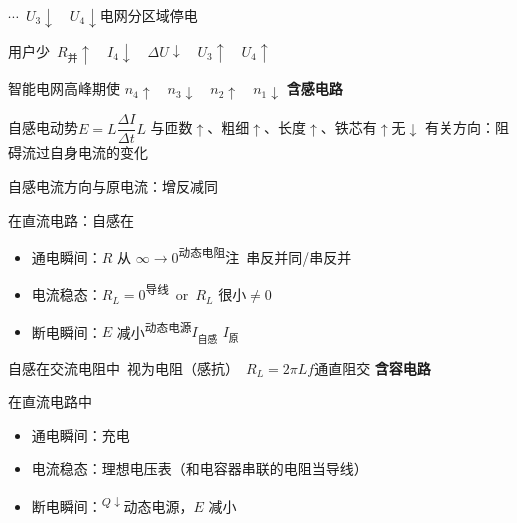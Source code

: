 \noindent $\cdots$\ $U_3\downarrow$\ \ $U_4\downarrow$\quad 电网分区域停电%

\noindent 用户少\ $R_{\text{并}}\uparrow$\ \ $I_4\downarrow$\ \ $\Delta U\downarrow$\ \ $U_3\uparrow$\ \ $U_4\uparrow$%

\noindent 智能电网\quad 高峰期使 $n_4\uparrow$\ \ $n_3\downarrow$\ \ $n_2\uparrow$\ \ $n_1\downarrow$
\textbf{含感电路}

\noindent 自感电动势\quad $E=L\dfrac{\Delta I}{\Delta t}$\quad $L$ 与匝数$\uparrow$、粗细$\uparrow$、长度$\uparrow$、铁芯有$\uparrow$无$\downarrow$ 有关\quad 方向：阻碍流过自身电流的变化%

\noindent\hspace*{4em}自感电流方向与原电流：增反减同

\noindent 在直流电路：自感在
\begin{itemize}
\item 通电瞬间：$R$ 从 $\infty\to0$\textsuperscript{动态电阻}\quad 注\ 串反并同/串反并
\item 电流稳态：$R_L=0$\textsuperscript{导线}\ or\ $R_L$ 很小$\neq0$
\item 断电瞬间：$E$ 减小\textsuperscript{动态电源}\quad $I_{\text{自感}}$ \unclear{$\le$} $I_{\text{原}}$
\end{itemize}

\noindent 自感在交流电阻中\ 视为电阻（感抗）\ $R_L=2\pi Lf$\quad 通直阻交%
\textbf{含容电路}

\noindent 在直流电路中
\begin{itemize}
\item 通电瞬间：充电
\item 电流稳态：理想电压表（和电容器串联的电阻当导线）
\item 断电瞬间：\textsuperscript{$Q\downarrow$}动态电源，$E$ 减小
\end{itemize}

